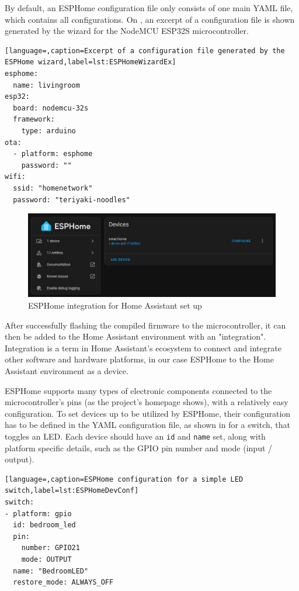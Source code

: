 By default, an ESPHome configuration file only consists of one main YAML file, which contains all configurations. On , an excerpt of a configuration file is shown generated by the wizard for the NodeMCU ESP32S microcontroller.

\begin{lstlisting}[language=,caption=Excerpt of a configuration file generated by the ESPHome wizard,label=lst:ESPHomeWizardEx]
esphome:
  name: livingroom
esp32:
  board: nodemcu-32s
  framework:
    type: arduino
ota:
  - platform: esphome
    password: ""
wifi:
  ssid: "homenetwork"
  password: "teriyaki-noodles"
\end{lstlisting}

\begin{figure}[!ht]
  \centering
  \includegraphics[width=150mm, keepaspectratio]{figures/homeassistant_esphome_int.png}
  \caption{ESPHome integration for Home Assistant set up}
  \label{fig:HAesphomeint}
\end{figure}

After successfully flashing the compiled firmware to the microcontroller, it can then be added to the Home Assistant environment with an "integration". Integration is a term in Home Assistant's ecosystem to connect and integrate other software and hardware platforms, in our case ESPHome to the Home Assistant environment as a device. \cite{HAConceptsTerminology}

ESPHome supports many types of electronic components connected to the microcontroller's pins (as the project's homepage shows), with a relatively easy configuration. \cite{ESPHomeHomepage} To set devices up to be utilized by ESPHome, their configuration has to be defined in the YAML configuration file, as shown in  for a switch, that toggles an LED. Each device should have an \verb+id+ and \verb+name+ set, along with platform specific details, such as the GPIO pin number and mode (input / output).

\begin{lstlisting}[language=,caption=ESPHome configuration for a simple LED switch,label=lst:ESPHomeDevConf]
switch:
- platform: gpio
  id: bedroom_led
  pin:
    number: GPIO21
    mode: OUTPUT
  name: "BedroomLED"
  restore_mode: ALWAYS_OFF
\end{lstlisting}

